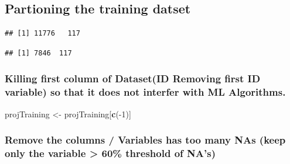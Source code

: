 \documentclass[]{article}
\newenvironment{Shaded}{\begin{snugshade}}{\end{snugshade}}
\newcommand{\KeywordTok}[1]{\textcolor[rgb]{0.13,0.29,0.53}{\textbf{{#1}}}}
\newcommand{\DataTypeTok}[1]{\textcolor[rgb]{0.13,0.29,0.53}{{#1}}}
\newcommand{\DecValTok}[1]{\textcolor[rgb]{0.00,0.00,0.81}{{#1}}}
\newcommand{\FloatTok}[1]{\textcolor[rgb]{0.00,0.00,0.81}{{#1}}}
\newcommand{\StringTok}[1]{\textcolor[rgb]{0.31,0.60,0.02}{{#1}}}
\newcommand{\OtherTok}[1]{\textcolor[rgb]{0.56,0.35,0.01}{{#1}}}
\newcommand{\NormalTok}[1]{{#1}}
\begin{document}
\subsection{Partioning the training
datset}\label{partioning-the-training-datset}

\begin{Shaded}
\end{Shaded}

\begin{verbatim}
## [1] 11776   117
\end{verbatim}

\begin{verbatim}
## [1] 7846  117
\end{verbatim}

\subsubsection{Killing first column of Dataset(ID Removing first ID
variable) so that it does not interfer with ML
Algorithms.}\label{killing-first-column-of-datasetid-removing-first-id-variable-so-that-it-does-not-interfer-with-ml-algorithms.}

\begin{Shaded}
\begin{Highlighting}[]
\NormalTok{projTraining <-}\StringTok{ }\NormalTok{projTraining[}\KeywordTok{c}\NormalTok{(-}\DecValTok{1}\NormalTok{)]}
\end{Highlighting}
\end{Shaded}

\subsubsection{Remove the columns / Variables has too many NAs (keep
only the variable \textgreater{} 60\% threshold of
NA's)}\label{remove-the-columns-variables-has-too-many-nas-keep-only-the-variable-60-threshold-of-nas}
\end{document}
